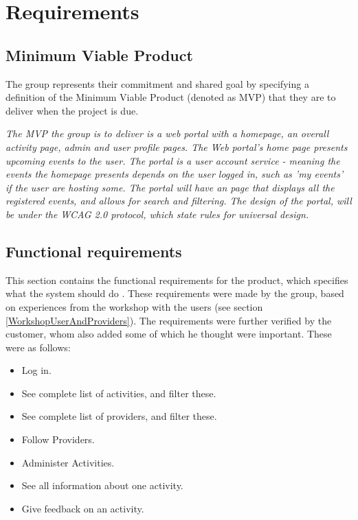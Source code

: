 
\chapter{Requirements}

\section{Minimum Viable Product}
\label{MVP}
The group represents their commitment and shared goal by specifying a definition of the Minimum Viable Product (denoted as MVP) that they are to deliver when the project is due.

\textit{ The MVP the group is to deliver is a web portal with a homepage, an overall activity page, admin and user profile pages. The Web portal's home page presents upcoming events to the user. The portal is a user account service - meaning the events the homepage presents depends on the user logged in, such as 'my events'  if the user are hosting some. The portal will have an page that displays all the registered events, and allows for search and filtering. 
The design of the portal, will be under the WCAG 2.0 protocol, which state rules for universal design.}

\section{Functional requirements}
\label{functional_requirements}
This section contains the functional requirements for the product, which specifies what the system should do \cite{requirements}. These requirements were made by the group, based on experiences from the workshop with the users (see section \ref{WorkshopUserAndProviders}). The requirements were further verified by the customer, whom also added some of which he thought were important. These were as follows:
\begin{itemize}[noitemsep]
    \item Log in.
    \item See complete list of activities, and filter these.
    \item See complete list of providers, and filter these.
    \item Follow Providers. 
    \item Administer Activities.
    \item See all information about one activity.
    \item Give feedback on an activity.
\end{itemize}


